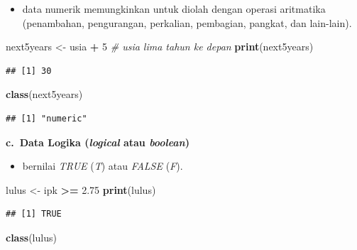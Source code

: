 \documentclass[
  12pt,
  a4paper,
]{scrbook}
\newenvironment{Shaded}{\begin{snugshade}}{\end{snugshade}}
\newcommand{\CommentTok}[1]{\textcolor[rgb]{0.56,0.35,0.01}{\textit{#1}}}
\newcommand{\DecValTok}[1]{\textcolor[rgb]{0.00,0.00,0.81}{#1}}
\newcommand{\FloatTok}[1]{\textcolor[rgb]{0.00,0.00,0.81}{#1}}
\newcommand{\KeywordTok}[1]{\textcolor[rgb]{0.13,0.29,0.53}{\textbf{#1}}}
\newcommand{\NormalTok}[1]{#1}
\newcommand{\OperatorTok}[1]{\textcolor[rgb]{0.81,0.36,0.00}{\textbf{#1}}}
\newcommand{\StringTok}[1]{\textcolor[rgb]{0.31,0.60,0.02}{#1}}
\providecommand{\tightlist}{%
  \setlength{\itemsep}{0pt}\setlength{\parskip}{0pt}}
\begin{document}
\begin{itemize}
\tightlist
\item
  data numerik memungkinkan untuk diolah dengan operasi aritmatika
  (penambahan, pengurangan, perkalian, pembagian, pangkat, dan
  lain-lain).
\end{itemize}

\begin{Shaded}
\begin{Highlighting}[]
\NormalTok{next5years <-}\StringTok{ }\NormalTok{usia }\OperatorTok{+}\StringTok{ }\DecValTok{5}  \CommentTok{# usia lima tahun ke depan}
\KeywordTok{print}\NormalTok{(next5years)}
\end{Highlighting}
\end{Shaded}

\begin{verbatim}
## [1] 30
\end{verbatim}

\begin{Shaded}
\begin{Highlighting}[]
\KeywordTok{class}\NormalTok{(next5years)}
\end{Highlighting}
\end{Shaded}

\begin{verbatim}
## [1] "numeric"
\end{verbatim}

\textbf{c.~Data Logika (\emph{logical} atau \emph{boolean})}

\begin{itemize}
\tightlist
\item
  bernilai \emph{TRUE} (\emph{T}) atau \emph{FALSE} (\emph{F}).
\end{itemize}

\begin{Shaded}
\begin{Highlighting}[]
\NormalTok{lulus <-}\StringTok{ }\NormalTok{ipk }\OperatorTok{>=}\StringTok{ }\FloatTok{2.75}
\KeywordTok{print}\NormalTok{(lulus)}
\end{Highlighting}
\end{Shaded}

\begin{verbatim}
## [1] TRUE
\end{verbatim}

\begin{Shaded}
\begin{Highlighting}[]
\KeywordTok{class}\NormalTok{(lulus)}
\end{Highlighting}
\end{Shaded}
\end{document}
